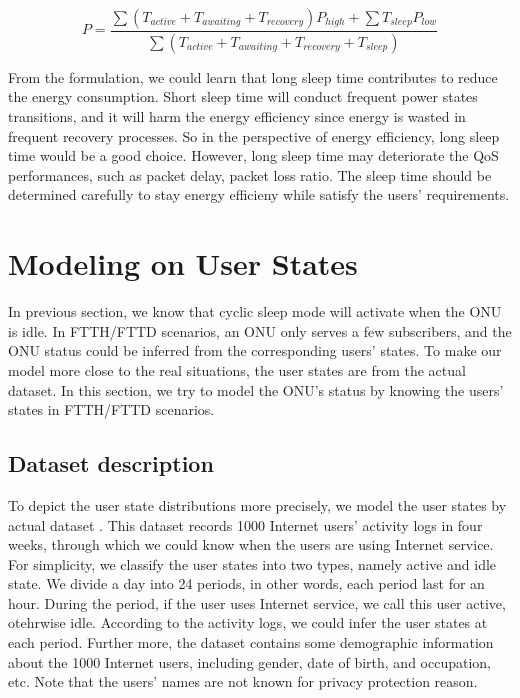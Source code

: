 \documentclass[journal]{IEEEtran}
\begin{document}
\begin{footnotesize}
\begin{equation}
P = \frac{\sum({T_{active} + T_{awaiting} + T_{recovery}}){P_{high}} + \sum T_{sleep}P_{low}}{\sum( {T_{active} +  T_{awaiting} + T_{recovery} + T_{sleep}})}
\end{equation}
\end{footnotesize}

From the formulation, we could learn that long sleep time contributes to reduce the energy consumption. Short sleep time will conduct frequent power states transitions, and it will harm the energy efficiency since energy is wasted in frequent recovery processes. So in the perspective of energy efficiency, long sleep time would be a good choice. However, long sleep time may deteriorate the QoS performances, such as packet delay, packet loss ratio. The sleep time should be determined carefully to stay energy efficieny while satisfy the users' requirements. 

\section{Modeling on User States}

In previous section, we know that cyclic sleep mode will activate when the ONU is idle. In FTTH/FTTD scenarios, an ONU only serves a few subscribers, and the ONU status could be inferred from the corresponding users' states. To make our model more close to the real situations, the user states are from the actual dataset. In this section, we try to model the ONU's status by knowing the users' states in FTTH/FTTD scenarios.

\subsection{Dataset description}
To depict the user state distributions more precisely, we model the user states by actual dataset \cite{Datatang}. This dataset records 1000 Internet users' activity logs in four weeks, through which we could know when the users are using Internet service. For simplicity, we classify the user states into two types, namely active and idle state. We divide a day into 24 periods, in other words, each period last for an hour. During the period, if the user uses Internet service, we call this user active, otehrwise idle. According to the activity logs, we could infer the user states at each period. Further more, the dataset contains some demographic information about the 1000 Internet users, including gender, date of birth, and occupation, etc. Note that the users' names are not known for privacy protection reason. 
\end{document}
